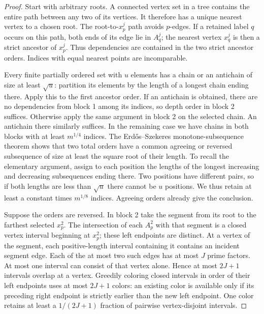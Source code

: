 \begin{proof}
Start with arbitrary roots.  A connected vertex set in a tree
contains the entire path between any two of its vertices.  It
therefore has a unique nearest vertex to a chosen root.  The
root-to-$x_p^j$ path avoids $p$-edges.  If a retained label $q$
occurs on this path, both ends of its edge lie in $A_q^j$;
the nearest vertex $x_q^j$ is then a strict ancestor of $x_p^j$.
Thus dependencies are contained in the two strict ancestor orders.
Indices with equal nearest points are incomparable.

Every finite partially ordered set with $u$ elements has a chain
or an antichain of size at least $\sqrt u$: partition its elements
by the length of a longest chain ending there.  Apply this to the
first ancestor order.  If an antichain is obtained, there are no
dependencies from block 1 among its indices, so depth order in
block 2 suffices.  Otherwise apply the same argument in block 2
on the selected chain.  An antichain there similarly suffices.
In the remaining case we have chains in both blocks with at least
$m^{1/4}$ indices.  The Erd\H{o}s--Szekeres monotone-subsequence theorem
\cite[p.~467]{ErdosSzekeres1935} shows that two total orders have a
common agreeing or reversed subsequence of size at least the square
root of their length.  To recall the elementary argument, assign to each position the lengths
of the longest increasing and decreasing subsequences ending
there.  Two positions have different pairs, so if both lengths
are less than $\sqrt u$ there cannot be $u$ positions.  We thus
retain at least a constant times $m^{1/8}$ indices.  Agreeing
orders already give the conclusion.

Suppose the orders are reversed.  In block 2 take the segment
from its root to the farthest selected $x_p^2$.  The intersection
of each $A_p^2$ with that segment is a closed vertex interval
beginning at $x_p^2$; these left endpoints are distinct.  At a
vertex of the segment, each positive-length interval containing
it contains an incident segment edge.  Each of the at most two
such edges has at most $J$ prime factors.  At most one interval
can consist of that vertex alone.  Hence at most $2J+1$ intervals
overlap at a vertex.  Greedily coloring closed intervals in order
of their left endpoints uses at most $2J+1$ colors: an existing
color is available only if its preceding right endpoint is
strictly earlier than the new left endpoint.  One color retains
at least a $1/(2J+1)$ fraction of pairwise vertex-disjoint intervals.


\end{proof}
